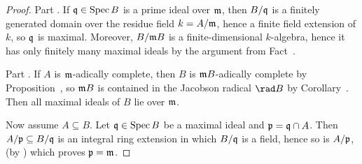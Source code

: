 \documentclass[a4paper,parskip=half,numbers=enddot, DIV=12]{scrreprt}
\begin{document}
\begin{proof}
	Part . If $\mathfrak{q}\in\operatorname{Spec} B$ is a prime ideal over $\mathfrak{m}$, then $B/\mathfrak{q}$ is a finitely generated domain over the residue field $k=A/\mathfrak{m}$, hence a finite field extension of $k$, so $\mathfrak{q}$ is maximal. Moreover, $B/\mathfrak{m} B$ is a finite-dimensional $k$-algebra, hence it has only finitely many maximal ideals by the argument from Fact~.
	
	Part . If $A$ is $\mathfrak{m}$-adically complete, then $B$ is $\mathfrak{m} B$-adically complete by Proposition~, so $\mathfrak{m} B$ is contained in the Jacobson radical $\rad B$ by Corollary~. Then all maximal ideals of $B$ lie over $\mathfrak{m}$.
	
	Now assume $A\subseteq B$. Let $\mathfrak{q}\in\operatorname{Spec} B$ be a maximal ideal and $\mathfrak{p}=\mathfrak{q}\cap A$. Then $A/\mathfrak{p}\subseteq B/\mathfrak{q}$ is an integral ring extension in which $B/\mathfrak{q}$ is a field, hence so is $A/\mathfrak{p}$, (by \cite[Proposition~1.5.1]{alg1}) which proves $\mathfrak{p}=\mathfrak{m}$.
\end{proof}

\printbibliography
\end{document}
